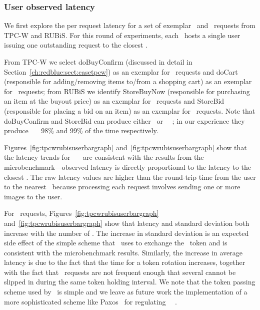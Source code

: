 \subsubsection{User observed latency}
We first explore the per request latency for a set of exemplar
\blue\ and \red\ requests from TPC-W and RUBiS.  For this round of experiments, each
\dc\ hosts a single user issuing one outstanding request to the
closest \dc.

From TPC-W we select doBuyConfirm (discussed in detail in
Section~\ref{ch:redblue:sect:casetpcw}) as an exemplar for \red\ requests and doCart
(responsible for adding/removing items to/from a shopping cart) as an
exemplar for \blue\ requests; from RUBiS we identify StoreBuyNow
(responsible for purchasing an item at the buyout price) as an
exemplar for \red\ requests and StoreBid (responsible for placing a
bid on an item) as an exemplar for \blue\ requests.  Note that
doBuyConfirm and StoreBid can produce either \red\ or
\blue\ \shadow\ \operations; in our experience they produce
\red\ \shadow\ \operations\ 98\% and 99\% of the time respectively.

Figures~\ref{fig:tpcwrubisuserbargraph} and~\ref{fig:tpcwrubisuserbargraph} show
that the latency trends for \blue\ \shadow\ \operations\ are consistent
with the results from the microbenchmark---observed latency is directly
proportional to the latency to the closest \dc.  The raw latency
values are higher than the round-trip time from the user to the
nearest \dc\ because processing each request involves sending one or
more images to the user.

For \red\ requests, Figures~\ref{fig:tpcwrubisuserbargraph} 
and~\ref{fig:tpcwrubisuserbargraph} show
that latency and standard deviation both
increase with the number of \dcs.  The increase in standard deviation
is an expected side effect of the simple scheme that \gemini\ uses to
exchange the \red\ token and is consistent with the microbenchmark
results.  Similarly, the increase in average latency is due to the
  fact that the time for a token rotation increases, together with the
  fact that \red\ requests are not frequent enough that several
  cannot be slipped in during the same token holding interval.  We
note that the token passing scheme used by \gemini\ is simple and
we leave as future work the implementation of a more sophisticated
scheme like Paxos~\cite{Lamport1998Paxos} for
regulating \red\ \shadow\ \operations.

